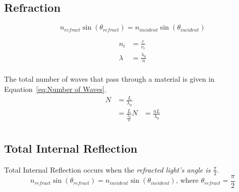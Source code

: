 \subsection{Refraction}\label{subsec:Refraction}
\begin{definition}\label{def:Snell's Law}
  \begin{equation}\label{eq:Refracted Light}
    n_{refract} \sin \left( \theta_{refract} \right) = n_{incident} \sin \left( \theta_{incident} \right)
  \end{equation}
\end{definition}
\begin{definition}\label{def:Index of Refraction}
  \begin{equation}\label{eq:Index of Refraction}
    \begin{aligned}
      n_{i} &= \frac{c}{v_{i}} \\
      \lambda &= \frac{\lambda_{0}}{n} \\
    \end{aligned}
  \end{equation}
\end{definition}
The total number of waves that pass through a material is given in Equation~\eqref{eq:Number of Waves}.
\begin{equation}\label{eq:Number of Waves}
  \begin{aligned}
    N &= \frac{L}{\lambda_{n}} \\
    &= \frac{L}{\frac{\lambda_{0}}{n}}
    N &= \frac{nL}{\lambda_{0}} \\
  \end{aligned}
\end{equation}

\subsection{Total Internal Reflection}\label{subsec:Total Internal Reflection}
\begin{definition}\label{def:Total Internal Reflection}
  Total Internal Reflection occurs when the \emph{refracted light's angle is $\frac{\pi}{2}$}.
  \begin{equation}\label{eq:Total Internal Reflection}
    n_{refract} \sin \left( \theta_{refract} \right) = n_{incident} \sin \left( \theta_{incident} \right) \text{, where } \theta_{refract} = \frac{\pi}{2}
  \end{equation}
\end{definition}

